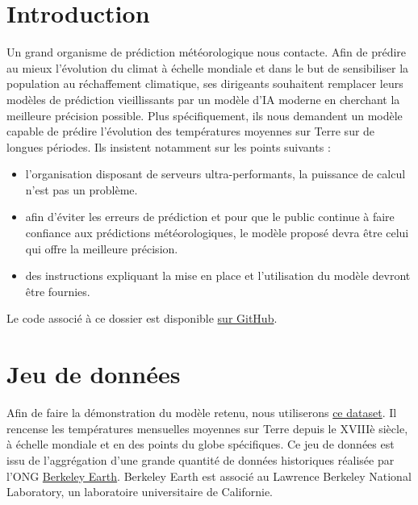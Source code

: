 \documentclass[french]{article}
\begin{document}
    \section*{Introduction}

    Un grand organisme de prédiction météorologique nous contacte. 
    Afin de prédire au mieux l'évolution du climat à échelle mondiale et dans le but de sensibiliser la population au réchaffement climatique, ses dirigeants souhaitent remplacer leurs modèles de prédiction vieillissants par un modèle d'IA moderne en cherchant la meilleure précision possible. Plus spécifiquement, ils nous demandent un modèle capable de prédire l'évolution des températures moyennes sur Terre sur de longues périodes. Ils insistent notamment sur les points suivants :
    \begin{itemize}
        \item l'organisation disposant de serveurs ultra-performants, la puissance de calcul n'est pas un problème.
        \item afin d'éviter les erreurs de prédiction et pour que le public continue à faire confiance aux prédictions météorologiques, le modèle proposé devra être celui qui offre la meilleure précision.
        \item des instructions expliquant la mise en place et l'utilisation du modèle devront être fournies.
    \end{itemize}
    
    Le code associé à ce dossier est disponible \href{https://github.com/vinpap/predict_climate_change}{sur GitHub}.

    \section{Jeu de données}
    
    Afin de faire la démonstration du modèle retenu, nous utiliserons \href{https://www.kaggle.com/datasets/berkeleyearth/climate-change-earth-surface-temperature-data}{ce dataset}. Il rencense les températures mensuelles moyennes sur Terre depuis le XVIIIè siècle, à échelle mondiale et en des points du globe spécifiques. Ce jeu de données est issu de l'aggrégation d'une grande quantité de données historiques réalisée par l'ONG \href{http://berkeleyearth.org/about/}{Berkeley Earth}. Berkeley Earth est associé au Lawrence Berkeley National Laboratory, un laboratoire universitaire de Californie.
\end{document}
